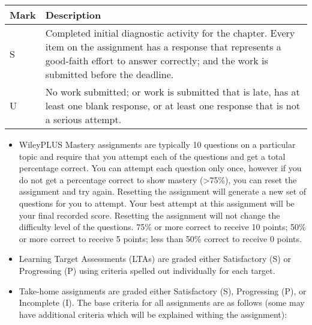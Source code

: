 \begin{longtable}[]{@{}ll@{}}
\toprule
\begin{minipage}[b]{0.30\columnwidth}\raggedright
Mark\strut
\end{minipage} & \begin{minipage}[b]{0.64\columnwidth}\raggedright
Description\strut
\end{minipage}\tabularnewline
\midrule
\endhead
\begin{minipage}[t]{0.30\columnwidth}\raggedright
S\strut
\end{minipage} & \begin{minipage}[t]{0.64\columnwidth}\raggedright
Completed initial diagnostic activity for the chapter. Every item on the
assignment has a response that represents a good-faith effort to answer
correctly; and the work is submitted before the deadline.\strut
\end{minipage}\tabularnewline
\begin{minipage}[t]{0.30\columnwidth}\raggedright
U\strut
\end{minipage} & \begin{minipage}[t]{0.64\columnwidth}\raggedright
No work submitted; or work is submitted that is late, has at least one
blank response, or at least one response that is not a serious
attempt.\strut
\end{minipage}\tabularnewline
\bottomrule
\end{longtable}

\begin{itemize}
\tightlist
\item
  WileyPLUS Mastery assignments are typically 10 questions on a
  particular topic and require that you attempt each of the questions
  and get a total percentage correct. You can attempt each question only
  once, however if you do not get a percentage correct to show mastery
  (\textgreater75\%), you can reset the assignment and try again.
  Resetting the assignment will generate a new set of questions for you
  to attempt. Your best attempt at this assignment will be your final
  recorded score. Resetting the assignment will not change the
  difficulty level of the questions. 75\% or more correct to receive 10
  points; 50\% or more correct to receive 5 points; less than 50\%
  correct to receive 0 points.
\item
  Learning Target Assessments (LTAs) are graded either Satisfactory (S)
  or Progressing (P) using criteria spelled out individually for each
  target.
\item
  Take-home assignments are graded either Satisfactory (S), Progressing
  (P), or Incomplete (I). The base criteria for all assignments are as
  follows (some may have additional criteria which will be explained
  withing the assignment):
\end{itemize}

